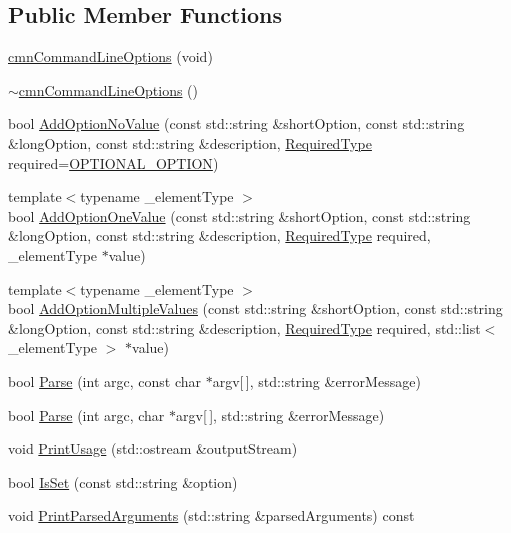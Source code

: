 \subsection*{Public Member Functions}
\begin{DoxyCompactItemize}
\item 
\hyperlink{classcmn_command_line_options_a240f609539b5521aea0ac95ba9753161}{cmn\+Command\+Line\+Options} (void)
\item 
\hyperlink{classcmn_command_line_options_a56acb6ec4ea3fbc95445a1ca6fa08653}{$\sim$cmn\+Command\+Line\+Options} ()
\item 
bool \hyperlink{classcmn_command_line_options_a7d8292a0b9cfcdc97591f55c41598ba5}{Add\+Option\+No\+Value} (const std\+::string \&short\+Option, const std\+::string \&long\+Option, const std\+::string \&description, \hyperlink{group__cisst_common_gac239a3ca62dd4e3b391824f6f1a97c76}{Required\+Type} required=\hyperlink{group__cisst_common_ggac239a3ca62dd4e3b391824f6f1a97c76a6734a70bf0045a4c08605f3ae473d533}{O\+P\+T\+I\+O\+N\+A\+L\+\_\+\+O\+P\+T\+I\+O\+N})
\item 
{\footnotesize template$<$typename \+\_\+element\+Type $>$ }\\bool \hyperlink{classcmn_command_line_options_af51a9e7df4d689c7de4daeebce7d313b}{Add\+Option\+One\+Value} (const std\+::string \&short\+Option, const std\+::string \&long\+Option, const std\+::string \&description, \hyperlink{group__cisst_common_gac239a3ca62dd4e3b391824f6f1a97c76}{Required\+Type} required, \+\_\+element\+Type $\ast$value)
\item 
{\footnotesize template$<$typename \+\_\+element\+Type $>$ }\\bool \hyperlink{classcmn_command_line_options_ae8fa287fe01d51d1eb8fdda682b07f26}{Add\+Option\+Multiple\+Values} (const std\+::string \&short\+Option, const std\+::string \&long\+Option, const std\+::string \&description, \hyperlink{group__cisst_common_gac239a3ca62dd4e3b391824f6f1a97c76}{Required\+Type} required, std\+::list$<$ \+\_\+element\+Type $>$ $\ast$value)
\item 
bool \hyperlink{classcmn_command_line_options_a7e6a6a950b408e0769ce9194d9cb65b5}{Parse} (int argc, const char $\ast$argv\mbox{[}$\,$\mbox{]}, std\+::string \&error\+Message)
\item 
bool \hyperlink{classcmn_command_line_options_a89ca67111b2e630f4792aaf43443afd9}{Parse} (int argc, char $\ast$argv\mbox{[}$\,$\mbox{]}, std\+::string \&error\+Message)
\item 
void \hyperlink{classcmn_command_line_options_a09d9261f50374d6178ab8865a16cad99}{Print\+Usage} (std\+::ostream \&output\+Stream)
\item 
bool \hyperlink{classcmn_command_line_options_aba78eaaa4cd80f68e5c64649bae98931}{Is\+Set} (const std\+::string \&option)
\item 
void \hyperlink{classcmn_command_line_options_aee814f6d6181c5ed6b98d0025bd54fe9}{Print\+Parsed\+Arguments} (std\+::string \&parsed\+Arguments) const 
\end{DoxyCompactItemize}
